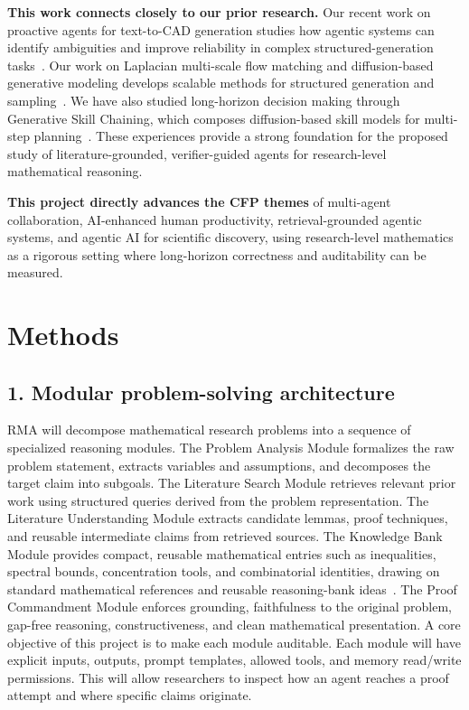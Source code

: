 \documentclass[11pt]{article}
\begin{document}
\textbf{This work connects closely to our prior research.} Our recent work on proactive agents for text-to-CAD generation studies how agentic systems can identify ambiguities and improve reliability in complex structured-generation tasks~\citep{yuan2026clarifydrawproactiveagents}. Our work on Laplacian multi-scale flow matching and diffusion-based generative modeling develops scalable methods for structured generation and sampling~\citep{zhao2026laplacian,zhang2021diffusionnormalizingflow}. We have also studied long-horizon decision making through Generative Skill Chaining, which composes diffusion-based skill models for multi-step planning~\citep{mishra2023generative}. These experiences provide a strong foundation for the proposed study of literature-grounded, verifier-guided agents for research-level mathematical reasoning.

\textbf{This project directly advances the CFP themes} of multi-agent collaboration, AI-enhanced human productivity, retrieval-grounded agentic systems, and agentic AI for scientific discovery, using research-level mathematics as a rigorous setting where long-horizon correctness and auditability can be measured.
\vspace{-7pt}
\section*{Methods}
\vspace{-7pt}
\subsection*{1. Modular problem-solving architecture}
\vspace{-7pt}
RMA will decompose mathematical research problems into a sequence of specialized reasoning modules. The Problem Analysis Module formalizes the raw problem statement, extracts variables and assumptions, and decomposes the target claim into subgoals. The Literature Search Module retrieves relevant prior work using structured queries derived from the problem representation. The Literature Understanding Module extracts candidate lemmas, proof techniques, and reusable intermediate claims from retrieved sources. The Knowledge Bank Module provides compact, reusable mathematical entries such as inequalities, spectral bounds, concentration tools, and combinatorial identities, drawing on standard mathematical references and reusable reasoning-bank ideas~\citep{boyd2004convex,mitzenmacher2017probability,ouyang2025reasoningbank}. The Proof Commandment Module enforces grounding, faithfulness to the original problem, gap-free reasoning, constructiveness, and clean mathematical presentation. A core objective of this project is to make each module auditable. Each module will have explicit inputs, outputs, prompt templates, allowed tools, and memory read/write permissions. This will allow researchers to inspect how an agent reaches a proof attempt and where specific claims originate.
\vspace{-10pt}
\end{document}
